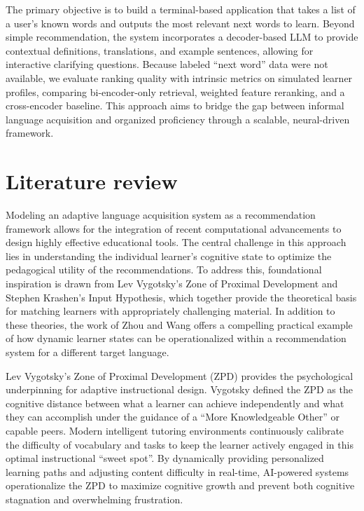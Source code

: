 \documentclass{article}
\begin{document}
The primary objective is to build a terminal-based application that takes a list of a user's known words and outputs the most relevant next words to learn. Beyond simple recommendation, the system incorporates a decoder-based LLM to provide contextual definitions, translations, and example sentences, allowing for interactive clarifying questions. Because labeled ``next word'' data were not available, we evaluate ranking quality with intrinsic metrics on simulated learner profiles, comparing bi-encoder-only retrieval, weighted feature reranking, and a cross-encoder baseline. This approach aims to bridge the gap between informal language acquisition and organized proficiency through a scalable, neural-driven framework.

\section{Literature review}

Modeling an adaptive language acquisition system as a recommendation framework allows for the integration of recent computational advancements to design highly effective educational tools. The central challenge in this approach lies in understanding the individual learner's cognitive state to optimize the pedagogical utility of the recommendations. To address this, foundational inspiration is drawn from Lev Vygotsky's Zone of Proximal Development\cite{vygotsky1978mind} and Stephen Krashen's Input Hypothesis\cite{krashen1977monitor}, which together provide the theoretical basis for matching learners with appropriately challenging material. In addition to these theories, the work of Zhou and Wang\cite{zhou2025simulation} offers a compelling practical example of how dynamic learner states can be operationalized within a recommendation system for a different target language.

Lev Vygotsky's Zone of Proximal Development (ZPD)\cite{vygotsky1978mind} provides the psychological underpinning for adaptive instructional design. Vygotsky defined the ZPD as the cognitive distance between what a learner can achieve independently and what they can accomplish under the guidance of a ``More Knowledgeable Other'' or capable peers. Modern intelligent tutoring environments continuously calibrate the difficulty of vocabulary and tasks to keep the learner actively engaged in this optimal instructional ``sweet spot''. By dynamically providing personalized learning paths and adjusting content difficulty in real-time, AI-powered systems operationalize the ZPD to maximize cognitive growth and prevent both cognitive stagnation and overwhelming frustration.
\end{document}
